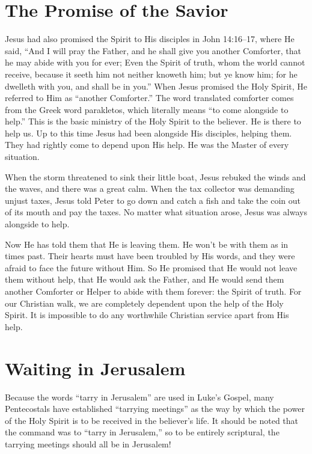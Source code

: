 \section*{The Promise of the Savior}

Jesus had also promised the Spirit to His disciples in
John 14:16–17, where He said, “And I will pray the Father,
and he shall give you another Comforter, that he may abide
with you for ever; Even the Spirit of truth, whom the world
cannot receive, because it seeth him not neither knoweth
him; but ye know him; for he dwelleth with you, and
shall be in you.” When Jesus promised the Holy Spirit, He
referred to Him as “another Comforter.” The word translated
comforter comes from the Greek word parakletos, which
literally means “to come alongside to help.” This is the basic
ministry of the Holy Spirit to the believer. He is there to help
us. Up to this time Jesus had been alongside His disciples,
helping them. They had rightly come to depend upon His
help. He was the Master of every situation.

When the storm threatened to sink their little boat, Jesus
rebuked the winds and the waves, and there was a great
calm. When the tax collector was demanding unjust taxes,
Jesus told Peter to go down and catch a fish and take the
coin out of its mouth and pay the taxes. No matter what
situation arose, Jesus was always alongside to help.

Now He has told them that He is leaving them. He
won’t be with them as in times past. Their hearts must have
been troubled by His words, and they were afraid to face
the future without Him. So He promised that He would
not leave them without help, that He would ask the Father,
and He would send them another Comforter or Helper to
abide with them forever: the Spirit of truth. For our Christian
walk, we are completely dependent upon the help of
the Holy Spirit. It is impossible to do any worthwhile Christian
service apart from His help.


\section*{Waiting in Jerusalem}

Because the words “tarry in Jerusalem” are used in
Luke’s Gospel, many Pentecostals have established “tarrying
meetings” as the way by which the power of the Holy
Spirit is to be received in the believer’s life. It should be
noted that the command was to “tarry in Jerusalem,” so to
be entirely scriptural, the tarrying meetings should all be in
Jerusalem!

